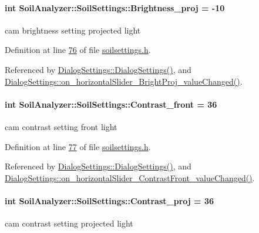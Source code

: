\paragraph[{Brightness\+\_\+proj}]{\setlength{\rightskip}{0pt plus 5cm}int Soil\+Analyzer\+::\+Soil\+Settings\+::\+Brightness\+\_\+proj = -\/10}\label{class_soil_analyzer_1_1_soil_settings_a1411d6f8eadfbedd8e23973b11d00c29}
cam brightness setting projected light 

Definition at line \hyperlink{soilsettings_8h_source_l00076}{76} of file \hyperlink{soilsettings_8h_source}{soilsettings.\+h}.



Referenced by \hyperlink{dialogsettings_8cpp_source_l00005}{Dialog\+Settings\+::\+Dialog\+Settings()}, and \hyperlink{dialogsettings_8cpp_source_l00339}{Dialog\+Settings\+::on\+\_\+horizontal\+Slider\+\_\+\+Bright\+Proj\+\_\+value\+Changed()}.

\hypertarget{class_soil_analyzer_1_1_soil_settings_ae4fbf0e9cd99cfa5a4f9cb8aaf0be652}{}
\paragraph[{Contrast\+\_\+front}]{\setlength{\rightskip}{0pt plus 5cm}int Soil\+Analyzer\+::\+Soil\+Settings\+::\+Contrast\+\_\+front = 36}\label{class_soil_analyzer_1_1_soil_settings_ae4fbf0e9cd99cfa5a4f9cb8aaf0be652}
cam contrast setting front light 

Definition at line \hyperlink{soilsettings_8h_source_l00077}{77} of file \hyperlink{soilsettings_8h_source}{soilsettings.\+h}.



Referenced by \hyperlink{dialogsettings_8cpp_source_l00005}{Dialog\+Settings\+::\+Dialog\+Settings()}, and \hyperlink{dialogsettings_8cpp_source_l00313}{Dialog\+Settings\+::on\+\_\+horizontal\+Slider\+\_\+\+Contrast\+Front\+\_\+value\+Changed()}.

\hypertarget{class_soil_analyzer_1_1_soil_settings_afb573e7bfd1fb5e3c13b84b91fbb0092}{}
\paragraph[{Contrast\+\_\+proj}]{\setlength{\rightskip}{0pt plus 5cm}int Soil\+Analyzer\+::\+Soil\+Settings\+::\+Contrast\+\_\+proj = 36}\label{class_soil_analyzer_1_1_soil_settings_afb573e7bfd1fb5e3c13b84b91fbb0092}
cam contrast setting projected light 

